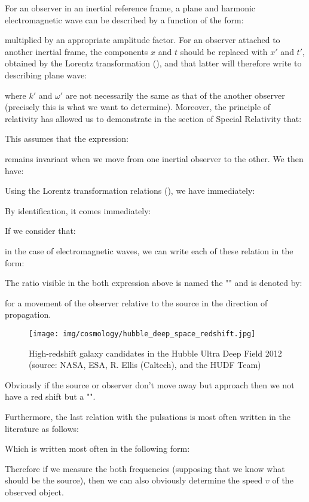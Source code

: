 	For an observer in an inertial reference frame, a plane and harmonic electromagnetic wave can be described by a function of the form:
	
	multiplied by an appropriate amplitude factor. For an observer attached to another inertial frame, the components $x$ and $t$ should be replaced with $x'$ and $t'$, obtained by the Lorentz transformation (), and that latter will therefore write to describing plane wave:
	
	where $k'$ and $\omega'$ are not necessarily the same as that of the another observer (precisely this is what we want to determine). Moreover, the principle of relativity has allowed us to demonstrate in the section of Special Relativity that:
	
	This assumes that the expression:
	
	remains invariant when we move from one inertial observer to the other. We then have:
	
	Using the Lorentz transformation relations (), we have immediately:
	
	By identification, it comes immediately:
	
	If we consider that:
	
	in the case of electromagnetic waves, we can write each of these relation in the form:
	
	The ratio visible in the both expression above is named the "" and is denoted by:
	
	for a movement of the observer relative to the source in the direction of propagation.
	\begin{figure}[H]
		\centering
		\texttt{[image: img/cosmology/hubble\_deep\_space\_redshift.jpg]}
		\caption{High-redshift galaxy candidates in the Hubble Ultra Deep Field 2012 (source: NASA, ESA, R. Ellis (Caltech), and the HUDF Team)}
	\end{figure}
	Obviously if the source or observer don't move away but approach then we not have a red shift but a "".
	
	Furthermore, the last relation with the pulsations is most often written in the literature as follows:
	
	Which is written most often in the following form:
	
	Therefore if we measure the both frequencies (supposing that we know what should be the source), then we can also obviously determine the speed $v$ of the observed object.
	

